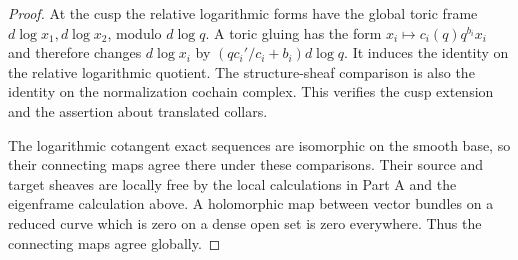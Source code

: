 \begin{proof}
At the cusp the relative logarithmic forms have the global toric frame
$d\log x_1,d\log x_2$, modulo $d\log q$.
A toric gluing has the form
$x_i\mapsto c_i(q)q^{b_i}x_i$ and therefore changes $d\log x_i$ by
$(q c_i'/c_i+b_i)d\log q$. It induces the identity on the relative
logarithmic quotient. The structure-sheaf comparison is also the identity
on the normalization cochain complex. This verifies the cusp extension
and the assertion about translated collars.

The logarithmic cotangent exact sequences are isomorphic on the smooth
base, so their connecting maps agree there under these comparisons.
Their source and target sheaves are locally free by the local calculations
in Part A and the eigenframe calculation above. A holomorphic map between
vector bundles on a reduced curve which is zero on a dense open set is
zero everywhere. Thus the connecting maps agree globally.
\end{proof}

